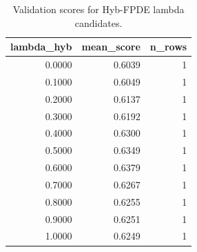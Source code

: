 \begin{table}[t]
\caption{Validation scores for Hyb-FPDE lambda candidates.}
\label{tab:lambda_distribution_computed}
\centering
\begin{tabular}{rrr}
\toprule
lambda\_hyb & mean\_score & n\_rows \\
\midrule
0.0000 & 0.6039 & 1 \\
0.1000 & 0.6049 & 1 \\
0.2000 & 0.6137 & 1 \\
0.3000 & 0.6192 & 1 \\
0.4000 & 0.6300 & 1 \\
0.5000 & 0.6349 & 1 \\
0.6000 & 0.6379 & 1 \\
0.7000 & 0.6267 & 1 \\
0.8000 & 0.6255 & 1 \\
0.9000 & 0.6251 & 1 \\
1.0000 & 0.6249 & 1 \\
\bottomrule
\end{tabular}

\end{table}
